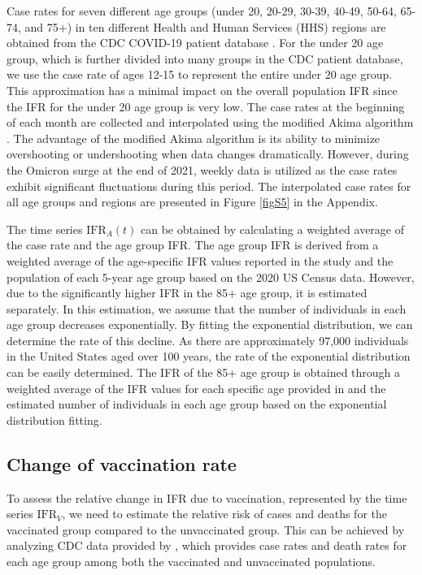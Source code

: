 \documentclass[sn-mathphys,Numbered]{sn-jnl}
\begin{document}
Case rates for seven different age groups (under 20, 20-29, 30-39, 40-49, 50-64, 65-74, and 75+) in ten different Health and Human Services (HHS) regions are obtained from the CDC COVID-19 patient database \cite{CDCcaserate}. For the under 20 age group, which is further divided into many groups in the CDC patient database, we use the case rate of ages 12-15 to represent the entire under 20 age group. This approximation has a minimal impact on the overall population IFR since the IFR for the under 20 age group is very low. The case rates at the beginning of each month are collected and interpolated using the modified Akima algorithm \cite{akima1970new,akima1974method}. The advantage of the modified Akima algorithm is its ability to minimize overshooting or undershooting when data changes dramatically. However, during the Omicron surge at the end of 2021, weekly data is utilized as the case rates exhibit significant fluctuations during this period. The interpolated case rates for all age groups and regions are presented in Figure \ref{figS5} in the Appendix.

The time series $\mathrm{IFR}_A(t)$ can be obtained by calculating a weighted average of the case rate and the age group IFR. The age group IFR is derived from a weighted average of the age-specific IFR values reported in the study \cite{IHME} and the population of each 5-year age group based on the 2020 US Census data. However, due to the significantly higher IFR in the 85+ age group, it is estimated separately. In this estimation, we assume that the number of individuals in each age group decreases exponentially. By fitting the exponential distribution, we can determine the rate of this decline. As there are approximately 97,000 individuals in the United States aged over 100 years, the rate of the exponential distribution can be easily determined. The IFR of the 85+ age group is obtained through a weighted average of the IFR values for each specific age provided in \cite{IHME} and the estimated number of individuals in each age group based on the exponential distribution fitting.






\subsection{Change of vaccination rate}
To assess the relative change in IFR due to vaccination, represented by the time series $\mathrm{IFR}_V$, we need to estimate the relative risk of cases and deaths for the vaccinated group compared to the unvaccinated group. This can be achieved by analyzing CDC data provided by \cite{CDCvacrate} , which provides case rates and death rates for each age group among both the vaccinated and unvaccinated populations.
\end{document}
